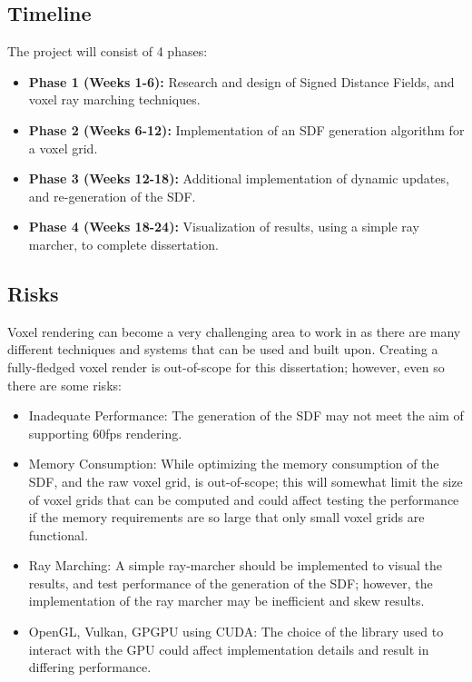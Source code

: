 \documentclass{article}
\begin{document}
\subsection{Timeline}
The project will consist of 4 phases:

\begin{itemize}
    \item \textbf{Phase 1 (Weeks 1-6):} Research and design of Signed Distance Fields, and voxel ray marching techniques.
    \item \textbf{Phase 2 (Weeks 6-12):} Implementation of an SDF generation algorithm for a voxel grid.
    \item \textbf{Phase 3 (Weeks 12-18):} Additional implementation of dynamic updates, and re-generation of the SDF.
    \item \textbf{Phase 4 (Weeks 18-24):} Visualization of results, using a simple ray marcher, to complete dissertation.
\end{itemize}

\subsection{Risks}
Voxel rendering can become a very challenging area to work in as there are many different techniques and systems that can be used and built upon. Creating a fully-fledged voxel render is out-of-scope for this dissertation; however, even so there are some risks:

\begin{itemize}
    \item Inadequate Performance: The generation of the SDF may not meet the aim of supporting 60fps rendering.
    \item Memory Consumption: While optimizing the memory consumption of the SDF, and the raw voxel grid, is out-of-scope; this will somewhat limit the size of voxel grids that can be computed and could affect testing the performance if the memory requirements are so large that only small voxel grids are functional.
    \item Ray Marching: A simple ray-marcher should be implemented to visual the results, and test performance of the generation of the SDF; however, the implementation of the ray marcher may be inefficient and skew results.
    \item OpenGL, Vulkan, GPGPU using CUDA: The choice of the library used to interact with the GPU could affect implementation details and result in differing performance.
\end{itemize}



\end{document}
